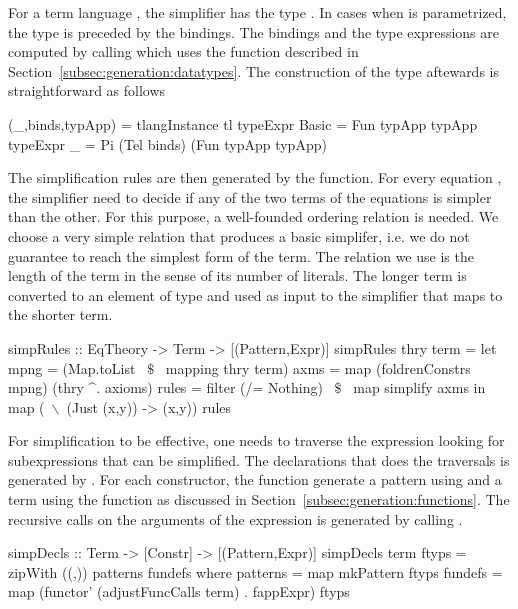 For a term language , the simplifier has the type . In cases when  is parametrized, the type is preceded by the bindings. The bindings and the type expressions are computed by calling  which uses the  function described in Section~\ref{subsec:generation:datatypes}. The construction of the type aftewards is straightforward as follows 
\begin{hscode} 
 (_,binds,typApp) = tlangInstance tl
 typeExpr Basic = Fun typApp typApp
 typeExpr _     = Pi (Tel binds) (Fun typApp typApp)
\end{hscode} 

The simplification rules are then generated by the  function. For every equation , the simplifier need to decide if any of the two terms of the equations is simpler than the other. For this purpose, a well-founded ordering relation is needed. We choose a very simple relation that produces a basic simplifer, i.e. we do not guarantee to reach the simplest form of the term. The relation we use is the length of the term in the sense of its number of literals. The longer term is converted to an element of type  and used as input to the simplifier that maps to the shorter term.  
\begin{hscode} 
simpRules :: EqTheory -> Term -> [(Pattern,Expr)]
simpRules thry term =
 let
  mpng = (Map.toList ~$\$$~ mapping thry term)
  axms = map (foldrenConstrs mpng) (thry ^. axioms) 
  rules = filter (/= Nothing) ~$\$$~ map simplify axms
 in map (~$\backslash$~(Just (x,y)) -> (x,y)) rules 
\end{hscode} 

For simplification to be effective, one needs to traverse the expression looking for subexpressions that can be simplified. The declarations that does the traversals is generated by . For each constructor, the function generate a pattern using  and a term using the  function as discussed in Section~\ref{subsec:generation:functions}. The recursive calls on the arguments of the expression is generated by calling . 
\begin{hscode}
simpDecls :: Term -> [Constr] -> [(Pattern,Expr)]
simpDecls term ftyps =
   zipWith ((,)) patterns fundefs
   where patterns = map mkPattern ftyps
         fundefs = map (functor' (adjustFuncCalls term) . fappExpr) ftyps
\end{hscode}

